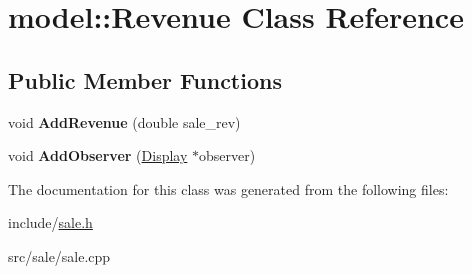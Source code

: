 \hypertarget{classmodel_1_1Revenue}{}\section{model\+:\+:Revenue Class Reference}
\label{classmodel_1_1Revenue}
\subsection*{Public Member Functions}
\begin{DoxyCompactItemize}
\item 
\mbox{\label{classmodel_1_1Revenue_a9f25a93014704646ac3b01bc7724b80c}} 
void {\bfseries Add\+Revenue} (double sale\+\_\+rev)
\item 
\mbox{\label{classmodel_1_1Revenue_ad0eb4ab904e594073c61bbb9a2a829e9}} 
void {\bfseries Add\+Observer} (\mbox{\hyperlink{classDisplay}{Display}} $\ast$observer)
\end{DoxyCompactItemize}


The documentation for this class was generated from the following files\+:\begin{DoxyCompactItemize}
\item 
include/\mbox{\hyperlink{sale_8h}{sale.\+h}}\item 
src/sale/sale.\+cpp\end{DoxyCompactItemize}
